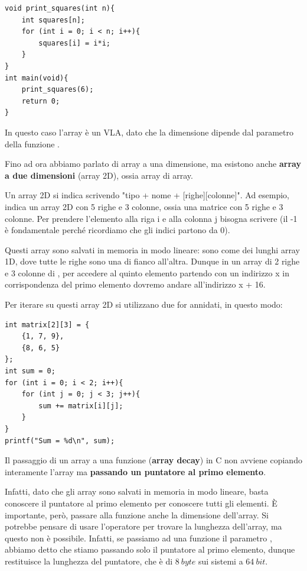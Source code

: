 \documentclass[11pt, a4paper, titlepage, oneside]{scrbook}
\begin{document}
\begin{lstlisting}[style=C]
void print_squares(int n){
    int squares[n]; 
    for (int i = 0; i < n; i++){
        squares[i] = i*i;
    }
}
int main(void){
    print_squares(6);
    return 0;
}
\end{lstlisting}
In questo caso l'array  è un VLA, dato che la dimensione dipende dal parametro della funzione .

\begin{Definizione}[Array 2D]
\label{def-array-2D}
Fino ad ora abbiamo parlato di array a una dimensione, ma esistono anche \textbf{array a due dimensioni} (array 2D), ossia array di array. 
\end{Definizione}

Un array 2D si indica scrivendo "tipo + nome + [righe][colonne]". Ad esempio,  indica un array 2D con 5 righe e 3 colonne, ossia una matrice con 5 righe e 3 colonne. Per prendere l'elemento alla riga i e alla colonna j bisogna scrivere  (il -1 è fondamentale perché ricordiamo che gli indici partono da 0).

Questi array sono salvati in memoria in modo lineare: sono come dei lunghi array 1D, dove tutte le righe sono una di fianco all'altra. Dunque in un array di 2 righe e 3 colonne di , per accedere al quinto elemento partendo con un indirizzo x in corrispondenza del primo elemento dovremo andare all'indirizzo x + 16.

Per iterare su questi array 2D si utilizzano due for annidati, in questo modo:
\begin{lstlisting}[style=C]
int matrix[2][3] = {
    {1, 7, 9},
    {8, 6, 5}
};
int sum = 0;
for (int i = 0; i < 2; i++){
    for (int j = 0; j < 3; j++){
        sum += matrix[i][j];
    }
}
printf("Sum = %d\n", sum);
\end{lstlisting}

\begin{Proprieta}
\label{prop-passare-array-funzioni}
Il passaggio di un array a una funzione (\textbf{array decay}) in C non avviene copiando interamente l'array ma \textbf{passando un puntatore al primo elemento}. 
\end{Proprieta}

Infatti, dato che gli array sono salvati in memoria in modo lineare, basta conoscere il puntatore al primo elemento per conoscere tutti gli elementi. È importante, però, passare alla funzione anche la dimensione dell'array. Si potrebbe pensare di usare l'operatore  per trovare la lunghezza dell'array, ma questo non è possibile. Infatti, se passiamo ad una funzione il parametro , abbiamo detto che stiamo passando solo il puntatore al primo elemento, dunque  restituisce la lunghezza del puntatore, che è di $\SI{8}{byte}$ sui sistemi a $\SI{64}{bit}$.
\end{document}
